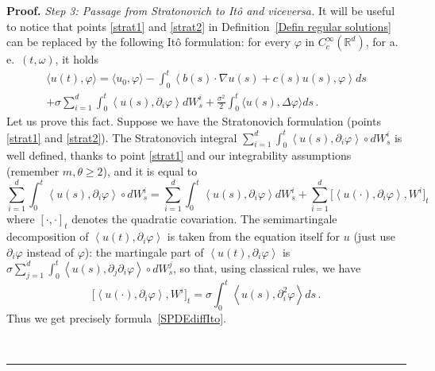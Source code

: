 \documentclass[a4paper,10pt]{article}
\newenvironment{proof}[1][Proof]{\noindent\textbf{#1.} }{\ \rule{0.5em}{0.5em}}
\newcommand{\lan}{\langle}
\newcommand{\ran}{\rangle}
\begin{document}
\begin{proof}
\emph{Step 3: Passage from Stratonovich to It\^o and viceversa.} It will be useful to notice that points \ref{strat1} and \ref{strat2} in Definition~\ref{Defin regular solutions} can be replaced by the following It\^o formulation: for every $\varphi$ in $C_{c}^{\infty}(\mathbb{R}^{d})$, for a.\,e.\ $(t,\omega)$, it holds
\begin{multline}
\langle u(  t)  ,\varphi\rangle=\langle u_{0},\varphi\rangle
-\int_{0}^{t}\left\langle b(  s)  \cdot\nabla u(  s)
+c(  s)  u(  s)  ,\varphi\right\rangle ds \\
  +\sigma \sum_{i=1}^{d}\int_{0}^{t}\left\langle u(s),\partial_{i}
\varphi\right\rangle dW_{s}^{i} +\frac{\sigma^2}{2} \int_{0}^{t} \lan u(s),\Delta\varphi\ran ds \,.\label{SPDEdiffIto}
\end{multline}
Let us prove this fact. Suppose we have the Stratonovich formulation (points \ref{strat1} and \ref{strat2}). The Stratono\-vich integral $\sum_{i=1}^{d}\int_{0}^{t}\left\langle u(  s)  ,\partial_{i}\varphi\right\rangle \circ dW_{s}^{i}$ is well defined, thanks to point \ref{strat1} and our integrability assumptions (remember $m,\theta\ge2$), and it is equal to
\[
\sum_{i=1}^{d}\int_{0}^{t}\left\langle u(  s)
,\partial_{i}\varphi\right\rangle \circ dW_{s}^{i}=\sum_{i=1}^{d}\int_{0} 
^{t}\left\langle u(  s)  ,\partial_{i}\varphi
\right\rangle dW_{s}^{i}+\sum_{i=1}^{d}\big[  \left\langle u(  \cdot)  ,\partial_{i}\varphi\right\rangle ,W^{i}\big]  _{t} 
\]
where $[\cdot,\cdot]_{t}$ denotes the quadratic covariation.
The semimartingale decomposition of $\left\langle u(
t)  ,\partial_{i}\varphi\right\rangle $ is taken from the equation
itself for $u$ (just use $\partial_i\varphi$ instead of $\varphi$): the martingale part of $\left\langle
u(t),\partial_{i}\varphi\right\rangle $ is $\sigma\sum_{j=1}^{d}\int_{0}^{t}\left\langle u(  s)
,\partial_{j}\partial_{i}\varphi\right\rangle \circ dW_{s}^{j}$, so that, using classical rules, we have
\[
\big[\left\langle u(\cdot),\partial_{i} \varphi\right\rangle ,W^{i} \big]_{t} = \sigma\int_{0}^{t} \left\langle
u(  s) ,\partial_{i}^{2}\varphi\right\rangle ds \,.
\]
Thus we get precisely formula~\eqref{SPDEdiffIto}.


\end{proof}
\end{document}
